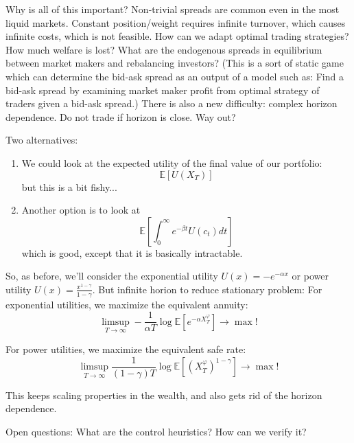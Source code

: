 Why is all of this important? Non-trivial spreads are common even in the most liquid markets. Constant position/weight requires infinite turnover, which causes infinite costs, which is not feasible. How can we adapt optimal trading strategies? How much welfare is lost? What are the endogenous spreads in equilibrium between market makers and rebalancing investors? (This is a sort of static game which can determine the bid-ask spread as an output of a model such as: Find a bid-ask spread by examining market maker profit from optimal strategy of traders given a bid-ask spread.) There is also a new difficulty: complex horizon dependence. Do not trade if horizon is close. Way out?

Two alternatives:
\begin{enumerate}
	\item We could look at the expected utility of the final value of our portfolio:
	\begin{equation}
		\mathbb{E}[U(X_T)]
	\end{equation}
	but this is a bit fishy...
	
	\item Another option is to look at
	\begin{equation}
		\mathbb{E}[ \int_0^\infty e^{-\beta t} U(c_t)dt ] 
	\end{equation}
	which is good, except that it is basically intractable.
\end{enumerate}

So, as before, we'll consider the exponential utility $U(x) = -e^{-\alpha x}$ or power utility $U(x) = \frac{x^{1-\gamma}}{1-\gamma}$. 
But infinite horion to reduce stationary problem:
	For exponential utilities, we maximize the equivalent annuity:
	\begin{equation}
		\limsup_{T\to \infty} - \frac{1}{\alpha T} \log \mathbb{E}\left[e^{-\alpha X_T^\varphi} \right] \to \max!
	\end{equation}
	
	For power utilities, we maximize the equivalent safe rate:
	\begin{equation}
		\limsup_{T\to \infty} \frac{1}{(1-\gamma) T} \log \mathbb{E}\left[ (X^\varphi_T)^{1-\gamma} \right] \to \max!
	\end{equation}

This keeps scaling properties in the wealth, and also gets rid of the horizon dependence.

Open questions: What are the control heuristics? How can we verify it?




